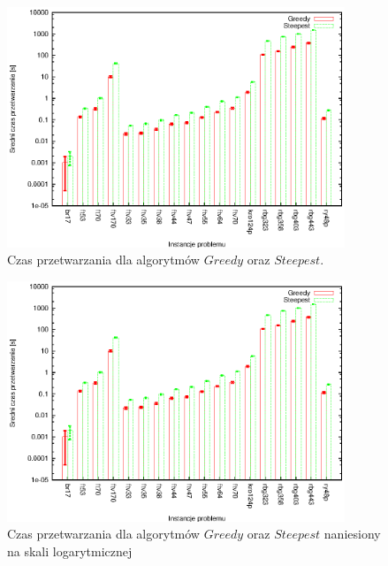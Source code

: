 \begin{figure}
\begin{center}
\includegraphics[width=0.9\textwidth]{wykresy/steepest_greedy_czas}
\end{center}
\caption{Czas przetwarzania dla algorytmów $Greedy$ oraz $Steepest$.}
\label{steepest_greedy_czas}
\end{figure}


\begin{figure}
\begin{center}
\includegraphics[width=0.9\textwidth]{wykresy/steepest_greedy_czas_log}
\end{center}
\caption{Czas przetwarzania dla algorytmów $Greedy$ oraz $Steepest$ naniesiony
na skali logarytmicznej}
\label{steepest_greedy_czas_log}
\end{figure}

